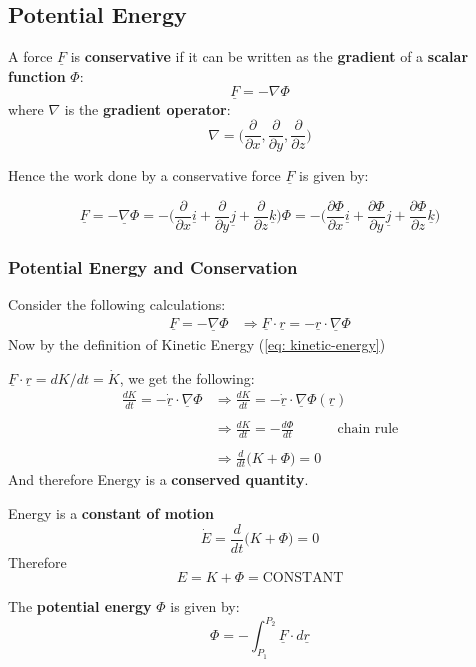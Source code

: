 \subsection{Potential Energy}
\begin{definition}
	A force $\underline{F}$ is {\bf conservative} if it can be written as the {\bf gradient} of a {\bf scalar function} $\Phi$:
	$$\underline{F} = -\nabla \Phi$$
	where $\nabla$ is the {\bf gradient operator}:
	$$\nabla = \Big(\frac{\partial}{\partial x}, \frac{\partial}{\partial y}, \frac{\partial}{\partial z}\Big)$$
\end{definition}
Hence the work done by a conservative force $\underline{F}$ is given by:

$$\underline{F} = - \underline{\nabla}\Phi = - \Big(\frac{\partial}{\partial x} \underline{i} + \frac{\partial}{\partial y} \underline{j} + \frac{\partial}{\partial z} \underline{k}\Big)\Phi = - \Big(\frac{\partial \Phi}{\partial x} \underline{i} + \frac{\partial \Phi}{\partial y} \underline{j} + \frac{\partial \Phi}{\partial z} \underline{k}\Big)$$

\subsubsection{Potential Energy and Conservation}
Consider the following calculations:
$$\begin{aligned} \underline{F} = - \underline{\nabla}\Phi &\Rightarrow \underline{F} \cdot \underline{r} = - \underline{r} \cdot \underline{\nabla}\Phi \end{aligned}$$
Now by the definition of Kinetic Energy (\ref{eq: kinetic-energy})

$\underline{F} \cdot \underline{r} = dK/dt = \dot{K}$, we get the following:
$$\begin{aligned} \frac{dK}{dt} = -\underline{\dot{r}} \cdot \underline{\nabla}\Phi & \Rightarrow  \frac{dK}{dt} = -\underline{\dot{r}}\cdot\underline{\nabla}\Phi(\underline{r}) \\ \\
                                                                                  & \Rightarrow \frac{dK}{dt} = -\frac{d\Phi}{dt} \ \ \ \ \ \ \ \ \ \ \ \ \ \ \text{chain rule} \\ \\
                                                                                  & \Rightarrow \frac{d}{dt}\Big(K + \Phi\Big) = 0\end{aligned}$$
And therefore Energy is a {\bf conserved quantity}.
\clearpage
\begin{definition}
	Energy is a {\bf constant of motion}
	$$\dot{E} = \frac{d}{dt}\Big(K + \Phi\Big) = 0$$
	Therefore
	$$E = K + \Phi = \text{CONSTANT}$$
\end{definition}

\begin{definition}
	The {\bf potential energy} $\Phi$ is given by:
	\begin{equation}
		\label{eq: potential-energy}
		\Phi = -\int_{P_{1}}^{P_{2}}\underline{F} \cdot d\underline{r}
	\end{equation}
\end{definition}
